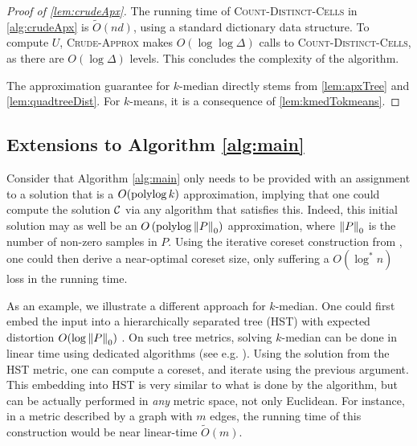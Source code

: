 \begin{proof}[Proof of \cref{lem:crudeApx}]

The running time of \textsc{Count-Distinct-Cells} in \cref{alg:crudeApx} is $\tilde O(nd)$, using a standard dictionary data structure. To compute $U$,
\textsc{Crude-Approx} makes $O(\log \log \Delta)$ calls to \textsc{Count-Distinct-Cells}, as there are $O(\log \Delta)$ levels. This concludes the complexity of
the algorithm.

The approximation guarantee for $k$-median directly stems from \cref{lem:apxTree} and \cref{lem:quadtreeDist}. For $k$-means, it is a consequence of
\cref{lem:kmedTokmeans}.

\end{proof}


\subsection{Extensions to Algorithm \ref{alg:main}}
\label{app:extensions}

Consider that Algorithm \ref{alg:main} only needs to be provided with an assignment to a solution that is a $O(\operatorname{polylog} k)$ approximation, implying that one
could compute the solution $\mathcal C$ via any algorithm that satisfies this.  Indeed, this initial solution may as well be an $O\left(\operatorname{polylog} \left\| P \right\|_0 \right)$
approximation, where $\left\| P \right\|_0$ is the number of non-zero samples in $P$. Using the iterative coreset construction from \cite{BravermanJKW21}, one could
then derive a near-optimal coreset size, only suffering a $O(\log^* n)$ loss in the running time.

As an example, we illustrate a different approach for $k$-median. One could first embed the input into a hierarchically separated tree (HST) with expected
distortion $O(\log \left\| P \right\|_0)$ \cite{FakcharoenpholRT03}. On such tree metrics, solving $k$-median can be done in linear time using dedicated algorithms
(see e.g. \cite{Cohen-AddadLNSS21}). Using the solution from the HST metric, one can compute a coreset, and iterate using the previous argument.  This embedding
into HST is very similar to what is done by the \fkmeans algorithm, but can be actually performed in \emph{any} metric space, not only Euclidean.  For instance,
in a metric described by a graph with $m$ edges, the running time of this construction would be near linear-time $\tilde O(m)$.

